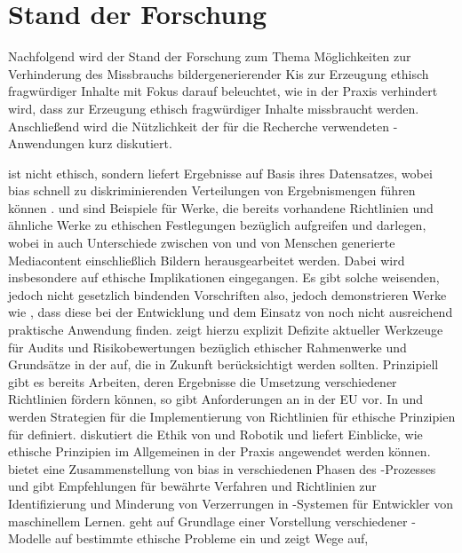 \chapter{Stand der Forschung}

Nachfolgend wird der Stand der Forschung zum Thema Möglichkeiten zur Verhinderung 
des Missbrauchs bildergenerierender Kis zur Erzeugung ethisch fragwürdiger Inhalte mit Fokus darauf beleuchtet, wie in der Praxis verhindert wird, dass  zur Erzeugung ethisch fragwürdiger Inhalte missbraucht werden. Anschließend wird die Nützlichkeit der für die Recherche verwendeten -Anwendungen kurz diskutiert.

 ist nicht ethisch, sondern liefert Ergebnisse auf Basis ihres Datensatzes, wobei \gls{bias} schnell zu diskriminierenden Verteilungen von Ergebnismengen führen können \cite{Salminen}. \cite{Jobin} und \cite{Partadiredja} sind Beispiele für Werke, die bereits vorhandene Richtlinien und ähnliche Werke zu ethischen Festlegungen bezüglich  
aufgreifen und darlegen, wobei in \cite{Partadiredja} auch Unterschiede zwischen von  und von Menschen generierte 
Mediacontent einschließlich Bildern herausgearbeitet werden. Dabei wird insbesondere auf ethische Implikationen eingegangen. 
Es gibt solche weisenden, jedoch nicht gesetzlich bindenden Vorschriften also, jedoch demonstrieren Werke wie 
\cite{Ayling}, dass diese bei der Entwicklung und dem Einsatz von  noch nicht ausreichend praktische Anwendung 
finden. \cite{Ayling} zeigt hierzu explizit Defizite aktueller Werkzeuge für Audits und Risikobewertungen bezüglich 
ethischer Rahmenwerke und Grundsätze in der  auf, die in Zukunft berücksichtigt werden sollten. 
Prinzipiell gibt es bereits Arbeiten, deren Ergebnisse die Umsetzung verschiedener Richtlinien fördern können, so gibt 
\cite{EUCommision} Anforderungen an  in der EU vor. In \cite{Jobin} und \cite{Hagendorff} werden Strategien 
für die Implementierung von Richtlinien für ethische Prinzipien für  definiert. \cite{Stahl} diskutiert die Ethik von  und Robotik 
und liefert Einblicke, wie ethische Prinzipien im Allgemeinen in der Praxis angewendet werden können. \cite{Srinivasan} bietet 
eine Zusammenstellung von \gls{bias} in verschiedenen Phasen des -Prozesses und gibt Empfehlungen für bewährte Verfahren und 
Richtlinien zur Identifizierung und Minderung von Verzerrungen in -Systemen für Entwickler von maschinellem Lernen. \cite{Jameel} 
geht auf Grundlage einer Vorstellung verschiedener -Modelle auf bestimmte ethische Probleme ein und zeigt Wege auf, 
